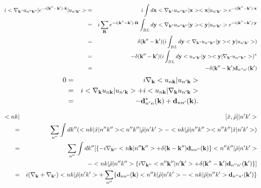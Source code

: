 \documentclass[aps,prb,preprint]{revtex4-1}
\begin{document}
\begin{appendix}
 \begin{eqnarray}
i <\nabla_{\bf k"} u_{n''{\bf k''}}| e^{-i{\bf (k''-k') \cdot \hat{x} }} |u_{n'{\bf k'}}> &=& i \int d{\bf x} <\nabla_{\bf k"} u_{n''{\bf k''}}|{\bf x}> <{\bf x}|u_{n'{\bf k'}}> e^{-i{\bf (k''-k' )\cdot {x}} }\nonumber \\
&=& i\sum_{\bf R} e^{-i{\bf (k''-k' )\cdot {\bf R}} } \int_{BL} d{\bf y} <\nabla_{\bf k"} u_{n''{\bf k''}}|{\bf y}> <{\bf y}|u_{n'{\bf k'}}> e^{-i{\bf (k''-k' )\cdot {y}} }\nonumber \\
&=& \delta({\bf k''-k'}) ( i \int_{BL} d{\bf y} <\nabla_{\bf k"} u_{n''{\bf k''}}|{\bf y}> <{\bf y}|u_{n'{\bf k'}}> )\nonumber \\
&=& - \delta({\bf k''-k'})  (i \int_{BL} d{\bf y} <u_{n'{\bf k'}}|{\bf y}> <{\bf y}|\nabla_{\bf k"} u_{n''{\bf k''}}>)^*\nonumber \\
&=& - \delta({\bf k''-k'}) {\bf d}_{n''n'}({\bf k'}) 
\end{eqnarray} 
%
\begin{eqnarray}
0 &=& i \nabla_{\bf k} <u_{n{\bf k}}|u_{n'{\bf k}}> \nonumber \\
 &=& i <\nabla_{\bf k} u_{n{\bf k}}|u_{n'{\bf k}}> + i <u_{n{\bf k}}|  \nabla_{\bf k} u_{n'{\bf k}}> \nonumber \\
 &=& - {\bf d}_{n'n}^*({\bf k}) + {\bf d}_{nn'}({\bf k}). 
 \end{eqnarray} 
 
\begin{eqnarray}
<nk|&&[\hat{x},\hat{\rho}]|n'k'> \nonumber \\
=&& \sum_{n''} \int dk'' (<nk|\hat{x}|n''k''><n''k''|\hat{\rho}|n'k'> - <nk|\hat{\rho}|n''k''><n''k''|\hat{x}|n'k'>) \nonumber \\
=&& \sum_{n''} \int dk'' [ \{ -i \nabla_{\bf k''} <n{\bf k}|n''{\bf k''}> + \delta({\bf k-k''}) {\bf d}_{nn''}({\bf k}) \}<n''k''|\hat{\rho}|n'k'> \nonumber \\
&& - <nk|\hat{\rho}|n''k''>\{ i \nabla_{\bf k''} <n''{\bf k''}|n'{\bf k'}> + \delta({\bf k''-k'}) {\bf d}_{n''n'}({\bf k'}) \} ] \nonumber \\
=&& i (\nabla_{\bf k} + \nabla_{\bf k'}) <nk|\hat{\rho}|n'k'> + \sum_{n''} \{ {\bf d}_{nn''}({\bf k}) <n''k|\hat{\rho}|n'k'> - <nk|\hat{\rho}|n''k'> {\bf d}_{n''n'}({\bf k'}) \}  \nonumber \\
\end{eqnarray} 


\end{appendix}
\end{document}
